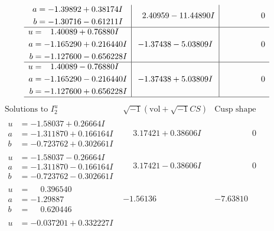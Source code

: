 \documentclass[1p]{elsarticle_modified}
\theoremstyle{definition}
\newcommand{\I}{\sqrt{-1}}
\begin{document}
$$\begin{array}{c|c|c}
\begin{aligned}
a &= -1.39892 + 0.38174 I \\
b &= -1.30716 - 0.61211 I\end{aligned}
 & \phantom{-}2.40959 - 11.44890 I & \phantom{-0.000000 } 0 \\ \hline\begin{aligned}
u &= \phantom{-}1.40089 + 0.76880 I \\
a &= -1.165290 + 0.216440 I \\
b &= -1.127600 - 0.656228 I\end{aligned}
 & -1.37438 - 5.03809 I & \phantom{-0.000000 } 0 \\ \hline\begin{aligned}
u &= \phantom{-}1.40089 - 0.76880 I \\
a &= -1.165290 - 0.216440 I \\
b &= -1.127600 + 0.656228 I\end{aligned}
 & -1.37438 + 5.03809 I & \phantom{-0.000000 } 0\\
 \hline 
 \end{array}$$\newpage$$\begin{array}{c|c|c}  
\text{Solutions to }I^u_{2}& \I (\text{vol} + \sqrt{-1}CS) & \text{Cusp shape}\\
 \hline 
\begin{aligned}
u &= -1.58037 + 0.26664 I \\
a &= -1.311870 + 0.166164 I \\
b &= -0.723762 + 0.302661 I\end{aligned}
 & \phantom{-}3.17421 + 0.38606 I & \phantom{-0.000000 } 0 \\ \hline\begin{aligned}
u &= -1.58037 - 0.26664 I \\
a &= -1.311870 - 0.166164 I \\
b &= -0.723762 - 0.302661 I\end{aligned}
 & \phantom{-}3.17421 - 0.38606 I & \phantom{-0.000000 } 0 \\ \hline\begin{aligned}
u &= \phantom{-}0.396540\phantom{ +0.000000I} \\
a &= -1.29887\phantom{ +0.000000I} \\
b &= \phantom{-}0.620446\phantom{ +0.000000I}\end{aligned}
 & -1.56136\phantom{ +0.000000I} & -7.63810\phantom{ +0.000000I} \\ \hline\begin{aligned}
u &= -0.037201 + 0.332227 I \\

\end{aligned}
\end{array}$$
\end{document}
